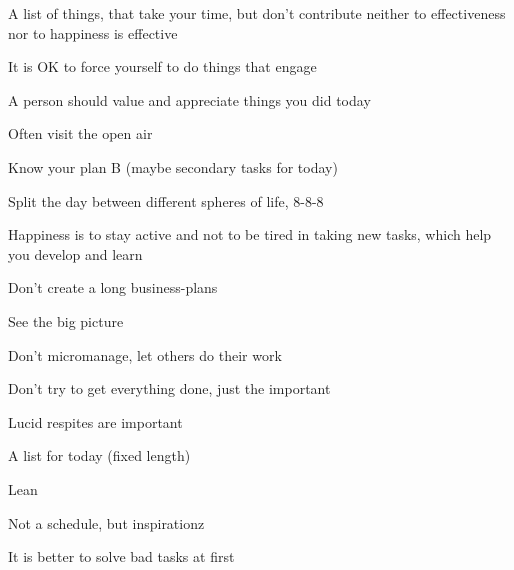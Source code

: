 \begin{compactenum}

\item A list of things, that take your time, but don't contribute neither to effectiveness nor to happiness is effective
\item It is OK to force yourself to do things that engage
\item A person should value and appreciate things you did today
\item Often visit the open air
\item Know your plan B (maybe secondary tasks for today)
\item Split the day between different spheres of life, 8-8-8
\item Happiness is to stay active and not to be tired in taking new tasks, which help you develop and learn
\item Don't create a long business-plans
\item See the big picture
\item Don't micromanage, let others do their work
\item Don't try to get everything done, just the important
\item Lucid respites are important
\item A list for today (fixed length)
\item Lean
\item Not a schedule, but inspirationz
\item It is better to solve bad tasks at first

\end{compactenum}

